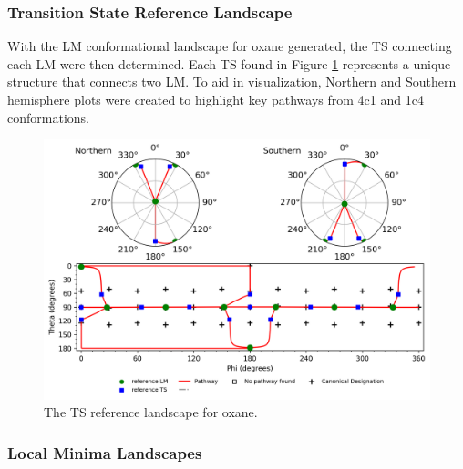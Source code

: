 \documentclass{article}
\begin{document}
\subsubsection{Transition State Reference Landscape}
With the LM conformational landscape for oxane generated, the TS connecting each LM were then determined. Each TS found in Figure
\ref{fig:oxane-ref-TS} represents a unique structure that connects two LM. To aid in visualization, Northern and Southern hemisphere plots
were created to highlight key pathways from 4c1 and 1c4 conformations.

\begin{figure}[H]
  	\centering
  	\includegraphics[width=\textwidth,height=\textheight,keepaspectratio]
	{figures/oxane/z_dataset-oxane-TS-heatmap-reference.png}
	\caption{The TS reference landscape for oxane.}
 	\label{fig:oxane-ref-TS}
\end{figure}


\subsubsection{Local Minima Landscapes}
\end{document}
